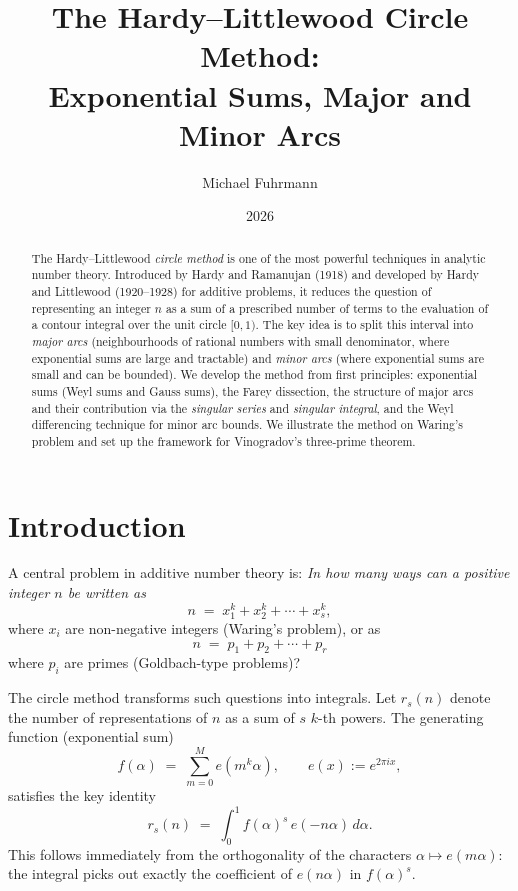\documentclass[12pt,a4paper]{amsart}
\theoremstyle{definition}
\newcommand{\eq}[1]{e\!\left(#1\right)}
\begin{document}

\title{The Hardy--Littlewood Circle Method:\\
       Exponential Sums, Major and Minor Arcs}

\author{Michael Fuhrmann}
\address{Specialist Mathematics Project, Build 80}
\date{2026}

\begin{abstract}
The Hardy--Littlewood \emph{circle method} is one of the most powerful
techniques in analytic number theory.  Introduced by Hardy and Ramanujan
(1918) and developed by Hardy and Littlewood (1920--1928) for additive
problems, it reduces the question of representing an integer $n$ as a sum
of a prescribed number of terms to the evaluation of a contour integral
over the unit circle $[0,1)$.  The key idea is to split this interval into
\emph{major arcs} (neighbourhoods of rational numbers with small
denominator, where exponential sums are large and tractable) and
\emph{minor arcs} (where exponential sums are small and can be bounded).
We develop the method from first principles: exponential sums (Weyl sums
and Gauss sums), the Farey dissection, the structure of major arcs and
their contribution via the \emph{singular series} and \emph{singular
integral}, and the Weyl differencing technique for minor arc bounds.
We illustrate the method on Waring's problem and set up the framework
for Vinogradov's three-prime theorem.
\end{abstract}

\maketitle
\tableofcontents

\section{Introduction}

A central problem in additive number theory is: \emph{In how many ways
can a positive integer $n$ be written as
\[
  n \;=\; x_1^k + x_2^k + \cdots + x_s^k,
\]}
where $x_i$ are non-negative integers (Waring's problem), or as
\[
  n \;=\; p_1 + p_2 + \cdots + p_r
\]
where $p_i$ are primes (Goldbach-type problems)?

The circle method transforms such questions into integrals.  Let
$r_s(n)$ denote the number of representations of $n$ as a sum of $s$
$k$-th powers.  The generating function (exponential sum)
\[
  f(\alpha) \;=\; \sum_{m=0}^{M} \eq{m^k \alpha},
  \qquad \eq{x} := e^{2\pi i x},
\]
satisfies the key identity
\begin{equation}\label{eq:key}
  r_s(n) \;=\; \int_0^1 f(\alpha)^s\, \eq{-n\alpha}\, d\alpha.
\end{equation}
This follows immediately from the orthogonality of the characters
$\alpha \mapsto \eq{m\alpha}$: the integral picks out exactly the
coefficient of $\eq{n\alpha}$ in $f(\alpha)^s$.
\end{document}
